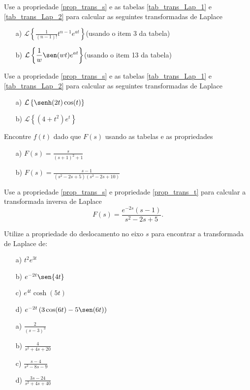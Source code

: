 \begin{exer}Use a propriedade \ref{prop_trans_s} e as tabelas \ref{tab_trans_Lap_1} e \ref{tab_trans_Lap_2} para calcular as seguintes transformadas de Laplace
\begin{itemize}
 \item[a)] $\displaystyle \mathcal{L}\left\{\frac{1}{(n-1)!}t^{n-1}e^{at}\right\}$\qquad (usando o item 3 da tabela)
 \item[b)] $\displaystyle \mathcal{L}\left\{\frac{1}{w}\sen(wt)e^{at}\right\}$\qquad (usando o item 13 da tabela)
\end{itemize}
\end{exer}
\begin{exer}Use a propriedade \ref{prop_trans_s} e as tabelas \ref{tab_trans_Lap_1} e \ref{tab_trans_Lap_2} para calcular as seguintes transformadas de Laplace
\begin{itemize}
 \item[a)] $\displaystyle \mathcal{L}\left\{\senh(2t)\cos(t)\right\}$
 \item[b)] $\displaystyle \mathcal{L}\left\{(4+t^2)e^t\right\}$
\end{itemize}
\end{exer}
\begin{exer}Encontre $f(t)$ dado que $F(s)$ usando as tabelas e as propriedades
\begin{itemize}
 \item[a)] $F(s)=\frac{s}{(s+1)^2+1}$
\item[b)] $F(s)=\frac{s-1}{(s^2-2s+5)(s^2-2s+10)}$
\end{itemize}
\end{exer}
\begin{exer}Use a propriedade \ref{prop_trans_s} e propriedade \ref{prop_trans_t} para calcular a transformada inversa de Laplace
\begin{equation}
F(s)=\frac{e^{-2s}(s-1)}{s^2 -2s+5}.
\end{equation}
\end{exer}
\begin{exer}
Utilize a propriedade do deslocamento no eixo $s$ para encontrar a transformada de Laplace de:
\begin{itemize}
  \item[a)] $t^2 e^{3t}$
  \item[b)] $e^{-2t} \sen {4t}$
  \item[c)] $e^{4t} \cosh (5t)$
  \item[d)] $e^{-2t} \left( 3 \cos(6t) - 5 \sen (6t) \right)$
  \end{itemize}
\end{exer}
\begin{resp}
\begin{itemize}
   \item[a)] $\displaystyle \frac{2}{(s-3)^3}$
  \item[b)] $\displaystyle \frac{4}{s^2 +4s +20}$
  \item[c)] $\displaystyle \frac{s-4}{s^2 - 8s - 9}$
  \item[d)] $\displaystyle \frac{3s -24}{s^2 +4s + 40}$
\end{itemize}
  \end{resp}
